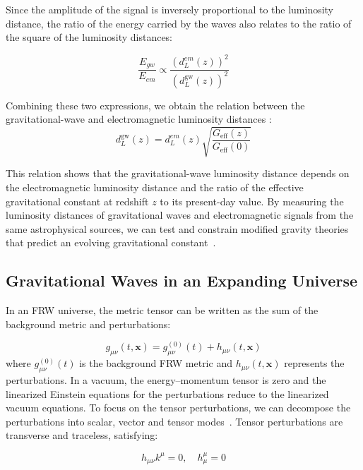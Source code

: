 \documentclass[universe,article,accept,moreauthors,pdftex]{Definitions/mdpi}
\newcommand{\be}{\begin{equation}}
\newcommand{\ee}{\end{equation}}
\begin{document}
Since the amplitude of the signal is inversely proportional to the luminosity distance, the ratio of the energy carried by the waves also relates to the ratio of the square of the luminosity distances:

\be 
\frac{E_{gw}}{E_{em}} \propto \frac{\left(d_{L}^{em}(z)\right)^2}{\left(d_{L}^{\text{gw}}(z)\right)^2}
\ee

Combining these two expressions, we obtain the relation between the gravitational-wave and electromagnetic luminosity distances \cite{Linder_2018,Belgacem:2017ihm}:
\be 
d_{L}^{\text{gw}}(z) = d_{L}^{em}(z) \sqrt{\frac{G_{\text{eff}}(z)}{G_{\text{eff}}(0)}}
\label{gwdl}
\ee

This relation shows that the gravitational-wave luminosity distance depends on the electromagnetic luminosity distance and the ratio of the effective gravitational constant at redshift $z$ to its present-day value. By measuring the luminosity distances of gravitational waves and electromagnetic signals from the same astrophysical sources, we can test and constrain modified gravity theories that predict an evolving gravitational \mbox{constant \cite{Nishizawa_2018,Belgacem_2018,article301,article302,DAgostino:2019hvh,Tasinato:2021wol}}.



\subsection{Gravitational Waves in an Expanding Universe}



In an FRW universe, the metric tensor can be written as the sum of the background metric and perturbations:

\begin{equation}
    g_{\mu\nu}(t, \mathbf{x}) = g_{\mu\nu}^{(0)}(t) + h_{\mu\nu}(t, \mathbf{x})
\end{equation}
where $g_{\mu\nu}^{(0)}(t)$ is the background FRW metric and $h_{\mu\nu}(t, \mathbf{{x} %
})$ represents the perturbations. In a vacuum, the energy--momentum tensor is zero and the linearized Einstein equations for the perturbations reduce to the linearized vacuum equations. To focus on the tensor perturbations, we can decompose the perturbations into scalar, vector and tensor \mbox{modes \cite{dodelson2020modern}.} Tensor perturbations are transverse and traceless, satisfying:

\be 
h_{\mu\nu}k^{\mu} = 0, \quad h^{\mu}_{\mu} = 0
\ee
\end{document}
